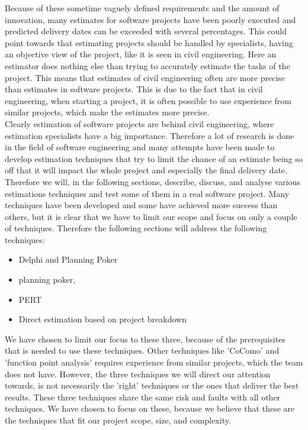 Because of these sometime vaguely defined requirements and the amount of innovation, many estimates for software projects have been poorly executed and predicted delivery dates can be exceeded with several percentages. This could point towards that estimating projects should be handled by specialists, having an objective view of the project, like it is seen in civil engineering. Here an estimator does nothing else than trying to accurately estimate the tasks of the project\cite[p140]{ProjectManagement_b}. This means that estimates of civil engineering often are more precise than estimates in software projects. This is due to the fact that in civil engineering, when starting a project, it is often possible to use experience from similar projects, which make the estimates more precise. \\
Clearly estimation of software projects are behind civil engineering, where estimation specialists have a big importance. Therefore a lot of research is done in the field of software engineering and many attempts have been made to develop estimation techniques that try to limit the chance of an estimate being so off that it will impact the whole project and especially the final delivery date. \\
Therefore we will, in the following sections, describe, discuss, and analyse various estimations techniques and test some of them in a real software project. Many techniques have been developed and some have achieved more success than others, but it is clear that we have to limit our scope and focus on only a couple of techniques. Therefore the following sections will address the following techniques: 
\begin{itemize}
\item Delphi and Planning Poker 
\item planning poker, 
\item PERT 
\item Direct estimation based on project breakdown
\end{itemize}
We have chosen to limit our focus to these three, because of the prerequisites that is needed to use these techniques. Other techniques like 'CoComo' and 'function point analysis' requires experience from similar projects, which the team does not have. However, the three techniques we will direct our attention towards, is not necessarily the 'right' techniques or the ones that deliver the best results. These three techniques share the same risk and faults with all other techniques. We have chosen to focus on these, because we believe that these are the techniques that fit our project scope, size, and complexity.
\\


